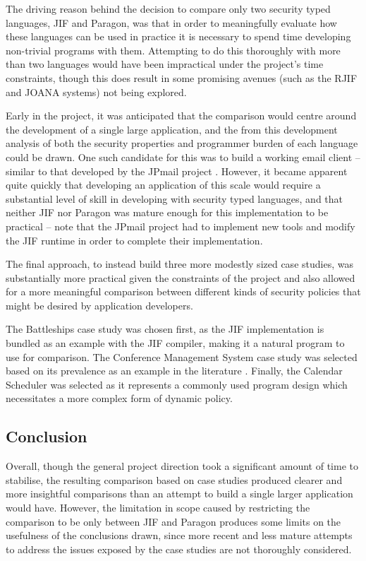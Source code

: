 The driving reason behind the decision to compare only two security typed languages, JIF and Paragon, was that in order to meaningfully evaluate how these languages can be used in practice it is necessary to spend time developing non-trivial programs with them. Attempting to do this thoroughly with more than two languages would have been impractical under the project's time constraints, though this does result in some promising avenues (such as the RJIF \cite{kozyri2016jrif} and JOANA \cite{graf2013joana} systems) not being explored.

Early in the project, it was anticipated that the comparison would centre around the development of a single large application, and the from this development analysis of both the security properties and programmer burden of each language could be drawn. One such candidate for this was to build a working email client -- similar to that developed by the JPmail project \cite{jpmailpage}. However, it became apparent quite quickly that developing an application of this scale would require a substantial level of skill in developing with security typed languages, and that neither JIF nor Paragon was mature enough for this implementation to be practical -- note that the JPmail project had to implement new tools and modify the JIF runtime in order to complete their implementation.

The final approach, to instead build three more modestly sized case studies, was substantially more practical given the constraints of the project and also allowed for a more meaningful comparison between different kinds of security policies that might be desired by application developers.

The Battleships case study was chosen first, as the JIF implementation is bundled as an example with the JIF compiler, making it a natural program to use for comparison. The Conference Management System case study was selected based on its prevalence as an example in the literature \cite{agrawal2016edas_conf} \cite{polikarpova2016lifty}. Finally, the Calendar Scheduler was selected as it represents a commonly used program design which necessitates a more complex form of dynamic policy.

\subsection{Conclusion}

Overall, though the general project direction took a significant amount of time to stabilise, the resulting comparison based on case studies produced clearer and more insightful comparisons than an attempt to build a single larger application would have. However, the limitation in scope caused by restricting the comparison to be only between JIF and Paragon produces some limits on the usefulness of the conclusions drawn, since more recent and less mature attempts to address the issues exposed by the case studies are not thoroughly considered.

